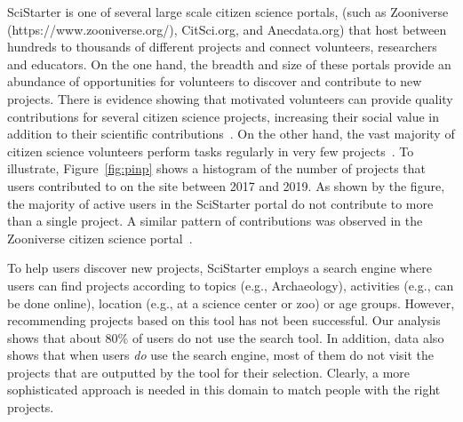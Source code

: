 \documentclass[letterpaper]{article} %
\newcommand{\kibitz}[2]{\ifnum\Comments=1{\textcolor{#1}{#2}}\fi}
\newcommand{\as}[1]{\kibitz{ orange}{[AS:#1]}}
\begin{document}
 SciStarter is one of several large scale citizen science portals, (such as Zooniverse (https://www.zooniverse.org/), CitSci.org, and 
Anecdata.org)
 that host between hundreds to thousands of different   projects and  connect volunteers, researchers and educators. On the one hand, 
 the breadth and size of these portals provide an abundance of opportunities  for volunteers to discover and contribute to new projects. 
  There is evidence showing that   motivated volunteers can provide quality contributions 
  for several citizen science projects, increasing their social value in addition to their scientific contributions~\cite{larson2020diverse}.  
  On the   other hand, the vast majority of citizen science volunteers perform tasks regularly in very few projects~\cite{ponciano2019characterising}. To illustrate,
    Figure~\ref{fig:pinp} shows a histogram 
  of the number of projects that users contributed to on the site between 2017 and 2019. As shown by the figure, the   majority of active users in the SciStarter portal do not contribute to more than a single project.  A similar pattern of contributions was observed in the 
  Zooniverse citizen science portal~\cite{segal2018optimizing}.

To help users discover new projects, SciStarter employs  a search engine  where users can find projects  according to topics (e.g., Archaeology), activities (e.g., can be done online), location (e.g., at a science center or zoo) or age groups. 
However, recommending projects based on this tool has not been successful.  Our analysis shows that about 80\% of users do not use the search tool. In addition, data also shows that when users \emph{do} use the search engine, most of them do not   visit the projects that are outputted by the tool for their selection. Clearly, a more sophisticated approach is needed in this domain to match people with the right projects.

 
\end{document}
